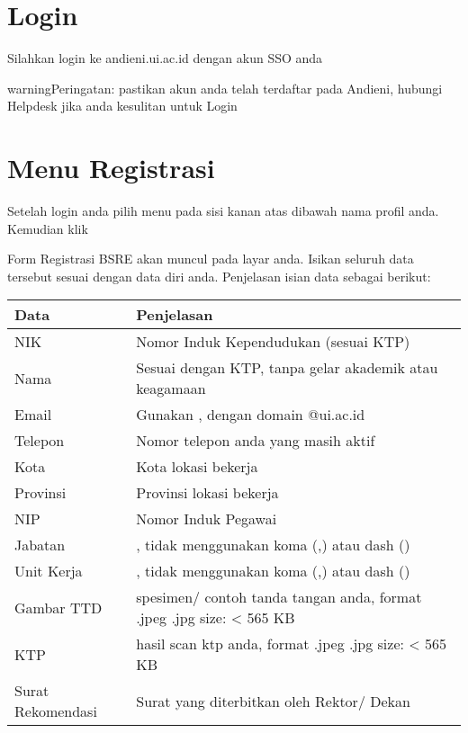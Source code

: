 \documentclass[letterpaper,10pt,bahasai]{sphinxmanual}
\begin{document}
\section{Login}
\label{\detokenize{daftar_eSign:login}}
Silahkan login ke andieni.ui.ac.id dengan akun SSO anda

\noindent{}

\begin{sphinxadmonition}{warning}{Peringatan:}
pastikan akun anda telah terdaftar pada Andieni, hubungi Helpdesk jika anda kesulitan untuk Login
\end{sphinxadmonition}


\section{Menu Registrasi}
\label{\detokenize{daftar_eSign:menu-registrasi}}
Setelah login anda pilih menu pada sisi kanan atas dibawah nama profil anda.
Kemudian klik 

\noindent{}

Form Registrasi BSRE akan muncul pada layar anda. Isikan seluruh data tersebut sesuai dengan data diri anda.
Penjelasan isian data sebagai berikut:

\noindent{}


\begin{savenotes}\sphinxattablestart
\centering
\begin{tabulary}{\linewidth}[t]{|T|T|}
\hline
\sphinxstyletheadfamily 
Data
&\sphinxstyletheadfamily 
Penjelasan
\\
\hline
NIK
&
Nomor Induk Kependudukan (sesuai KTP)
\\
\hline
Nama
&
Sesuai dengan KTP, tanpa gelar akademik atau keagamaan
\\
\hline
Email
&
Gunakan , dengan domain @ui.ac.id
\\
\hline
Telepon
&
Nomor telepon anda yang masih aktif
\\
\hline
Kota
&
Kota lokasi bekerja
\\
\hline
Provinsi
&
Provinsi lokasi bekerja
\\
\hline
NIP
&
Nomor Induk Pegawai
\\
\hline
Jabatan
&
, tidak menggunakan koma (,) atau dash (\sphinxhyphen{})
\\
\hline
Unit Kerja
&
, tidak menggunakan koma (,) atau dash (\sphinxhyphen{})
\\
\hline
Gambar TTD
&
spesimen/ contoh tanda tangan anda, format .jpeg .jpg size: \textless{} 565 KB
\\
\hline
KTP
&
hasil scan ktp anda, format .jpeg .jpg size: \textless{} 565 KB
\\
\hline
Surat Rekomendasi
&
Surat yang diterbitkan oleh Rektor/ Dekan
\\
\hline
\end{tabulary}
\par
\sphinxattableend\end{savenotes}
\end{document}
